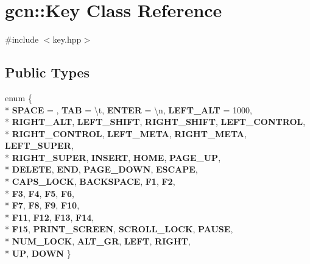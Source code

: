 \hypertarget{classgcn_1_1Key}{}\section{gcn\+:\+:Key Class Reference}
\label{classgcn_1_1Key}


{\ttfamily \#include $<$key.\+hpp$>$}

\subsection*{Public Types}
\begin{DoxyCompactItemize}
\item 
enum \{ \\*
{\bfseries S\+P\+A\+CE} = \textquotesingle{} \textquotesingle{}, 
{\bfseries T\+AB} = \textquotesingle{}\textbackslash{}t\textquotesingle{}, 
{\bfseries E\+N\+T\+ER} = \textquotesingle{}\textbackslash{}n\textquotesingle{}, 
{\bfseries L\+E\+F\+T\+\_\+\+A\+LT} = 1000, 
\\*
{\bfseries R\+I\+G\+H\+T\+\_\+\+A\+LT}, 
{\bfseries L\+E\+F\+T\+\_\+\+S\+H\+I\+FT}, 
{\bfseries R\+I\+G\+H\+T\+\_\+\+S\+H\+I\+FT}, 
{\bfseries L\+E\+F\+T\+\_\+\+C\+O\+N\+T\+R\+OL}, 
\\*
{\bfseries R\+I\+G\+H\+T\+\_\+\+C\+O\+N\+T\+R\+OL}, 
{\bfseries L\+E\+F\+T\+\_\+\+M\+E\+TA}, 
{\bfseries R\+I\+G\+H\+T\+\_\+\+M\+E\+TA}, 
{\bfseries L\+E\+F\+T\+\_\+\+S\+U\+P\+ER}, 
\\*
{\bfseries R\+I\+G\+H\+T\+\_\+\+S\+U\+P\+ER}, 
{\bfseries I\+N\+S\+E\+RT}, 
{\bfseries H\+O\+ME}, 
{\bfseries P\+A\+G\+E\+\_\+\+UP}, 
\\*
{\bfseries D\+E\+L\+E\+TE}, 
{\bfseries E\+ND}, 
{\bfseries P\+A\+G\+E\+\_\+\+D\+O\+WN}, 
{\bfseries E\+S\+C\+A\+PE}, 
\\*
{\bfseries C\+A\+P\+S\+\_\+\+L\+O\+CK}, 
{\bfseries B\+A\+C\+K\+S\+P\+A\+CE}, 
{\bfseries F1}, 
{\bfseries F2}, 
\\*
{\bfseries F3}, 
{\bfseries F4}, 
{\bfseries F5}, 
{\bfseries F6}, 
\\*
{\bfseries F7}, 
{\bfseries F8}, 
{\bfseries F9}, 
{\bfseries F10}, 
\\*
{\bfseries F11}, 
{\bfseries F12}, 
{\bfseries F13}, 
{\bfseries F14}, 
\\*
{\bfseries F15}, 
{\bfseries P\+R\+I\+N\+T\+\_\+\+S\+C\+R\+E\+EN}, 
{\bfseries S\+C\+R\+O\+L\+L\+\_\+\+L\+O\+CK}, 
{\bfseries P\+A\+U\+SE}, 
\\*
{\bfseries N\+U\+M\+\_\+\+L\+O\+CK}, 
{\bfseries A\+L\+T\+\_\+\+GR}, 
{\bfseries L\+E\+FT}, 
{\bfseries R\+I\+G\+HT}, 
\\*
{\bfseries UP}, 
{\bfseries D\+O\+WN}
 \}
\end{DoxyCompactItemize}
